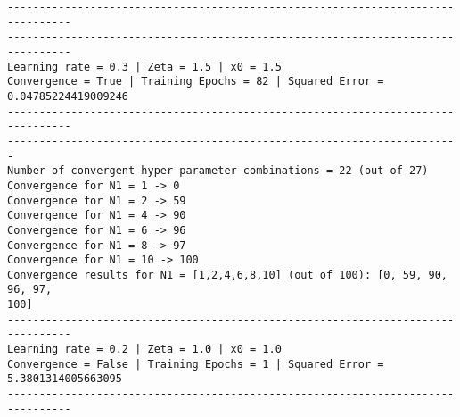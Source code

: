 \documentclass[11pt]{article}
\makeatletter
\newcommand{\boxspacing}{\kern\kvtcb@left@rule\kern\kvtcb@boxsep}
\newcommand{\prompt}[4]{
        \ttfamily\llap{{\color{#2}[#3]:\hspace{3pt}#4}}\vspace{-\baselineskip}
    }
\makeatother
\begin{document}
\begin{Verbatim}[commandchars=\\\{\}]
--------------------------------------------------------------------------------
--------------------------------------------------------------------------------
Learning rate = 0.3 | Zeta = 1.5 | x0 = 1.5
Convergence = True | Training Epochs = 82 | Squared Error = 0.04785224419009246
--------------------------------------------------------------------------------
-----------------------------------------------------------------------
Number of convergent hyper parameter combinations = 22 (out of 27)
Convergence for N1 = 1 -> 0
Convergence for N1 = 2 -> 59
Convergence for N1 = 4 -> 90
Convergence for N1 = 6 -> 96
Convergence for N1 = 8 -> 97
Convergence for N1 = 10 -> 100
Convergence results for N1 = [1,2,4,6,8,10] (out of 100): [0, 59, 90, 96, 97,
100]
--------------------------------------------------------------------------------
Learning rate = 0.2 | Zeta = 1.0 | x0 = 1.0
Convergence = False | Training Epochs = 1 | Squared Error = 5.3801314005663095
--------------------------------------------------------------------------------
    \end{Verbatim}

    \begin{tcolorbox}[breakable, size=fbox, boxrule=1pt, pad at break*=1mm,colback=cellbackground, colframe=cellborder]
\prompt{In}{incolor}{ }{\boxspacing}
\begin{Verbatim}[commandchars=\\\{\}]

\end{Verbatim}
\end{tcolorbox}


    
    
    
\end{document}
